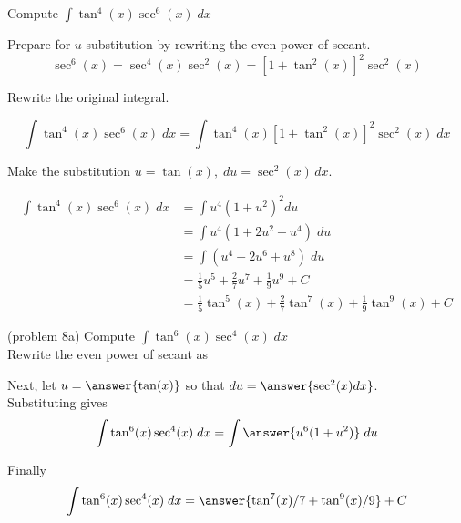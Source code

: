 \documentclass[handout]{ximera}
\begin{document}
\begin{example}[example 8]
Compute $\displaystyle{\int \tan^4(x) \sec^6(x)\;dx}$

Prepare for $u$-substitution by rewriting the even power of secant.
\[
\sec^6(x) = \sec^4(x) \sec^2(x) = \left[1+\tan^2(x)\right]^2 \sec^2(x)
\]

Rewrite the original integral.

\[
\int \tan^4(x) \sec^6(x)\;dx = \int \tan^4(x) \left[1+\tan^2(x)\right]^2 \sec^2(x) \; dx
\]

Make the substitution $u = \tan(x), \; du = \sec^2(x) \, dx$.


\begin{align*}
\int \tan^4(x) \sec^6(x)\;dx &= \int u^4 (1+u^2)^2 du\\
&= \int u^4(1+2u^2 + u^4) \; du \\
&= \int (u^4 + 2u^6 + u^8) \; du \\
&=  \tfrac15 u^5 + \tfrac27 u^7 + \tfrac19 u^9 + C  \\
&= \tfrac15\tan^5(x)  + \tfrac27 \tan^7(x) + \tfrac19 \tan^9(x) + C
\end{align*}
\end{example} 



\begin{problem}(problem 8a)
Compute $\displaystyle{\int \tan^6(x)\sec^4(x) \; dx}$\\

Rewrite the even power of secant as

\begin{multipleChoice}
\end{multipleChoice}

Next, let $u = \answer{\tan(x)}$ so that $du = \answer{\sec^2(x) dx}$.\\

Substituting gives 
\[
\int \tan^6(x)\sec^4(x) \; dx= \int \answer{u^6(1+u^2)} \; du
\]

Finally 
\[
\int \tan^6(x)\sec^4(x) \; dx= \answer{\tan^7(x)/7 +  \tan^9(x)/9} + C
\]

\end{problem}
\end{document}
